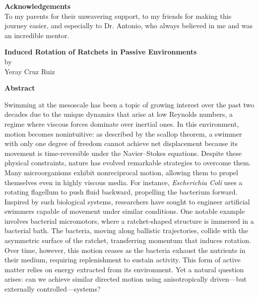 \newpage %
\Huge {\bf Acknowledgements} \\
\vfill
\normalsize To my parents for their unwavering support, to my friends for making this journey easier, and especially to Dr. Antonio, who always believed in me and was an incredible mentor. 
\vfill

\vspace{5em}

\newpage %
\begin{center}
  \large {{\bf Induced Rotation of Ratchets in Passive Environments}\\
  by\\
Yeray Cruz Ruiz}
\end{center}
\Huge{{\bf Abstract}} \\
\normalsize
\vspace*{0em}

Swimming at the mesoscale has been a topic of growing interest over the past two decades due to the unique dynamics that arise at low Reynolds numbers, a regime where viscous forces dominate over inertial ones. In this environment, motion becomes nonintuitive: as described by the scallop theorem, a swimmer with only one degree of freedom cannot achieve net displacement because its movement is time-reversible under the Navier–Stokes equations.
Despite these physical constraints, nature has evolved remarkable strategies to overcome them. Many microorganisms exhibit nonreciprocal motion, allowing them to propel themselves even in highly viscous media. For instance, \textit{Escherichia Coli} uses a rotating flagellum to push fluid backward, propelling the bacterium forward.
Inspired by such biological systems, researchers have sought to engineer artificial swimmers capable of movement under similar conditions. One notable example involves bacterial micromotors, where a ratchet-shaped structure is immersed in a bacterial bath. The bacteria, moving along ballistic trajectories, collide with the asymmetric surface of the ratchet, transferring momentum that induces rotation. Over time, however, this motion ceases as the bacteria exhaust the nutrients in their medium, requiring replenishment to sustain activity.
This form of active matter relies on energy extracted from its environment. Yet a natural question arises: can we achieve similar directed motion using anisotropically driven—but externally controlled—systems?

